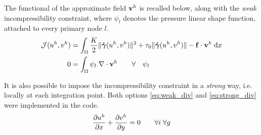 \documentclass[11 pt]{report}
\begin{document}
The functional of the approximate field $\mathbf{v}^h$ is recalled below, along with the \textit{weak} incompressibility constraint, where $\psi_l$ denotes the pressure linear shape function, attached to every primary node $l$.
\begin{align}
    \mathcal{J}(u^h, v^h) &= \int_{\Omega} \frac{K}{2} \|\boldsymbol{\dot \gamma}(u^h, v^h)\|^2 + \tau_0 \|\boldsymbol{\dot \gamma}(u^h, v^h)\| - \mathbf{f} \cdot \mathbf{v}^h \; \dd x\\
    0 &= \int_{\Omega} \psi_l \; \nabla \cdot \mathbf{v}^h \qquad \forall \quad \psi_l \label{eq:strong_div}
\end{align}

It is also possible to impose the incompressibility constraint in a \textit{strong} way, i.e. locally at each integration point\cite{Bleyer}. Both options \eqref{eq:weak_div} and \eqref{eq:strong_div} were implemented in the code.
\begin{equation}
    \pdv{u^h}{x} + \pdv{v^h}{y} = 0 \qquad \forall i \; \forall g \label{eq:weak_div}
\end{equation}
\end{document}
